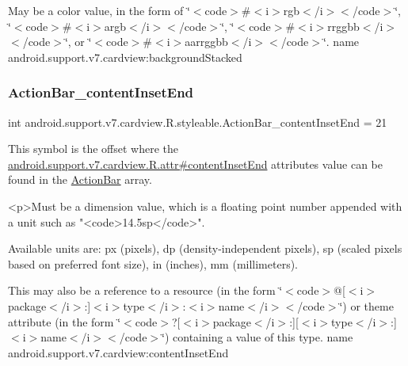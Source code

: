 May be a color value, in the form of \char`\"{}$<$code$>$\#$<$i$>$rgb$<$/i$>$$<$/code$>$\char`\"{}, \char`\"{}$<$code$>$\#$<$i$>$argb$<$/i$>$$<$/code$>$\char`\"{}, \char`\"{}$<$code$>$\#$<$i$>$rrggbb$<$/i$>$$<$/code$>$\char`\"{}, or \char`\"{}$<$code$>$\#$<$i$>$aarrggbb$<$/i$>$$<$/code$>$\char`\"{}.  name android.\+support.\+v7.\+cardview\+:background\+Stacked \mbox{\label{classandroid_1_1support_1_1v7_1_1cardview_1_1R_1_1styleable_ac13a0473d17683dad10beff0e1f9627b}} 
\subsubsection{\texorpdfstring{Action\+Bar\+\_\+content\+Inset\+End}{ActionBar\_contentInsetEnd}}
{\footnotesize\ttfamily int android.\+support.\+v7.\+cardview.\+R.\+styleable.\+Action\+Bar\+\_\+content\+Inset\+End = 21\hspace{0.3cm}{\ttfamily [static]}}

This symbol is the offset where the \hyperlink{classandroid_1_1support_1_1v7_1_1cardview_1_1R_1_1attr_a8d34f6f6765a63fc1536f666306ebf8f}{android.\+support.\+v7.\+cardview.\+R.\+attr\#content\+Inset\+End} attribute\textquotesingle{}s value can be found in the \hyperlink{classandroid_1_1support_1_1v7_1_1cardview_1_1R_1_1styleable_a0cbf7f776e31f78bb0a2b558daf176f8}{Action\+Bar} array.

\begin{DoxyVerb}      <p>Must be a dimension value, which is a floating point number appended with a unit such as "<code>14.5sp</code>".
\end{DoxyVerb}
 Available units are\+: px (pixels), dp (density-\/independent pixels), sp (scaled pixels based on preferred font size), in (inches), mm (millimeters). 

This may also be a reference to a resource (in the form \char`\"{}$<$code$>$@\mbox{[}$<$i$>$package$<$/i$>$\+:\mbox{]}$<$i$>$type$<$/i$>$\+:$<$i$>$name$<$/i$>$$<$/code$>$\char`\"{}) or theme attribute (in the form \char`\"{}$<$code$>$?\mbox{[}$<$i$>$package$<$/i$>$\+:\mbox{]}\mbox{[}$<$i$>$type$<$/i$>$\+:\mbox{]}$<$i$>$name$<$/i$>$$<$/code$>$\char`\"{}) containing a value of this type.  name android.\+support.\+v7.\+cardview\+:content\+Inset\+End \mbox{\label{classandroid_1_1support_1_1v7_1_1cardview_1_1R_1_1styleable_a25616fd348d614fe488889ce0079c9e9}} 
